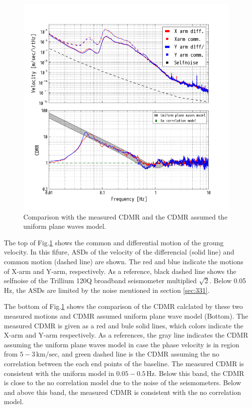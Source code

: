 \begin{figure}[h]
    \begin{center}   
      \includegraphics[width=13.0cm]{./img_chap3/img319.png}
      \caption{Comparison with the measured CDMR and the CDMR assumed the uniform plane waves model.}\label{img:img319}
    \end{center}
\end{figure}

The top of Fig.\ref{img:img319} shows the common and differential motion of the groung velocity. In this fifure, ASDs of the velocity of the differencial (solid line) and common motion (dashed line) are shown. The red and blue indicate the motions of X-arm and Y-arm, respectively. As a reference, black dashed line shows the selfnoise of the Trillium 120Q broadband seismometer multiplied $\sqrt{2}$. Below 0.05 Hz, the ASDs are limited by the noise mentioned in section \cref{sec:331}. 

The bottom of Fig.\ref{img:img319} shows the comparison of the CDMR calclated by these two measured motions and CDMR assumed uniform plane wave model (Bottom). The measured CDMR is given as a red and bule solid lines, which colors indicate the X-arm and Y-arm respectively. As a references, the gray line indicates the CDMR assuming the uniform plane waves model in case the phase velocity is in region from $5 - 3\,\mathrm{km/sec}$, and green dashed line is the CDMR assuming the no correlation between the each end points of the baseline. The measured CDMR is consistent with the uniform model in $0.05 - 0.5\,\mathrm{Hz}$. Below this band, the CDMR is close to the no correlation model due to the noise of the seismometers. Below and above this band, the measured CDMR is consistent with the no correlation model.

